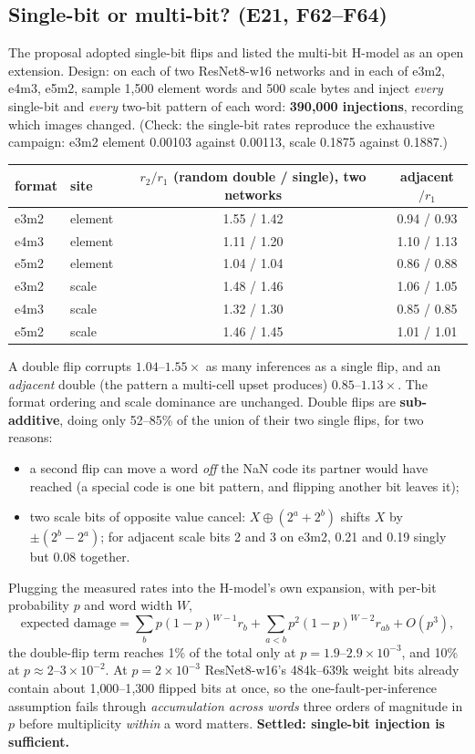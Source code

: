 \subsection{Single-bit or multi-bit? (E21, F62--F64)}
\label{sec:multibit}
The proposal adopted single-bit flips and listed the multi-bit H-model as an open extension. Design: on each of two ResNet8-w16 networks and in each of e3m2, e4m3, e5m2, sample 1{,}500 element words and 500 scale bytes and inject \emph{every} single-bit and \emph{every} two-bit pattern of each word: \textbf{390{,}000 injections}, recording which images changed.
(Check: the single-bit rates reproduce the exhaustive campaign: e3m2 element 0.00103 against 0.00113, scale 0.1875 against 0.1887.)
\begin{center}
\small
\begin{tabular}{llcc}
\toprule
format & site & $r_2/r_1$ (random double / single), two networks & adjacent$/r_1$ \\
\midrule
e3m2 & element & 1.55 / 1.42 & 0.94 / 0.93 \\
e4m3 & element & 1.11 / 1.20 & 1.10 / 1.13 \\
e5m2 & element & 1.04 / 1.04 & 0.86 / 0.88 \\
e3m2 & scale & 1.48 / 1.46 & 1.06 / 1.05 \\
e4m3 & scale & 1.32 / 1.30 & 0.85 / 0.85 \\
e5m2 & scale & 1.46 / 1.45 & 1.01 / 1.01 \\
\bottomrule
\end{tabular}
\end{center}
A double flip corrupts $1.04$--$1.55\times$ as many inferences as a single flip, and an \emph{adjacent} double (the pattern a multi-cell upset produces) $0.85$--$1.13\times$. The format ordering and scale dominance are unchanged. Double flips are \textbf{sub-additive}, doing only 52--85\% of the union of their two single flips, for two reasons:
\begin{itemize}
\item a second flip can move a word \emph{off} the NaN code its partner would have reached (a special code is one bit pattern, and flipping another bit leaves it);
\item two scale bits of opposite value cancel: $X\oplus(2^a+2^b)$ shifts $X$ by $\pm(2^b-2^a)$; for adjacent scale bits 2 and 3 on e3m2, 0.21 and 0.19 singly but 0.08 together.
\end{itemize}
Plugging the measured rates into the H-model's own expansion, with per-bit probability $p$ and word width $W$,
\[
\text{expected damage}=\sum_b p(1-p)^{W-1}r_b+\sum_{a<b}p^2(1-p)^{W-2}r_{ab}+O(p^3),
\]
the double-flip term reaches 1\% of the total only at $p=1.9$--$2.9\times10^{-3}$, and 10\% at $p\approx2$--$3\times10^{-2}$. At $p=2\times10^{-3}$ ResNet8-w16's 484k--639k weight bits already contain about 1{,}000--1{,}300 flipped bits at once, so the one-fault-per-inference assumption fails through \emph{accumulation across words}
three orders of magnitude in $p$ before multiplicity \emph{within} a word matters. \textbf{Settled: single-bit injection is sufficient.}


